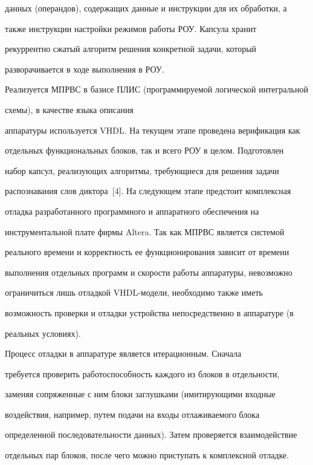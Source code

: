 данных (операндов), содержащих данные и инструкции для их обработки, а 


также инструкции настройки режимов работы РОУ. Капсула хранит 


рекуррентно сжатый алгоритм решения конкретной задачи, который 


разворачивается в ходе выполнения в РОУ.


      


      Реализуется МПРВС в базисе ПЛИС (программируемой логической интегральной


      схемы), в качестве языка описания 


аппаратуры используется VHDL. На текущем этапе проведена верификация как 


отдельных функциональных блоков, так и всего РОУ в целом. Подготовлен 


набор капсул, реализующих алгоритмы, требующиеся для решения задачи 


распознавания слов диктора~[4]. На следующем этапе предстоит комплексная 


отладка разработанного программного и аппаратного обеспечения на 


инструментальной плате фирмы Altera. Так как МПРВС является системой 


реального времени и корректность ее функционирования зависит от времени 


выполнения отдельных программ и скорости работы аппаратуры, невозможно 


ограничиться лишь отладкой VHDL-мо\-де\-ли, необходимо также иметь 


возможность проверки и отладки устройства непосредственно в аппаратуре (в 


реальных условиях).


      


      Процесс отладки в аппаратуре является итерационным. Сначала 


требуется проверить работоспособность каждого из блоков в отдельности, 


заменяя сопряженные с ним блоки заглушками (имитирующими входные 


воздействия, например, путем подачи на входы отлаживаемого блока 


определенной последовательности данных). Затем проверяется взаимодействие 


отдельных пар блоков, после чего можно приступать к комплексной отладке.


